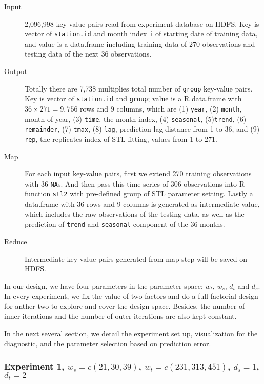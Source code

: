 \begin{description}
  \item[Input] 2,096,998 key-value pairs read from experiment database on HDFS.
  Key is vector of \texttt{station.id} and month index \texttt{i} of starting date
  of training data, and value is a data.frame including training data of 270 
  observations and testing data of the next 36 observations.
  \item[Output] Totally there are 7,738 multiplies total number of \texttt{group} 
  key-value pairs. 
  Key is vector of \texttt{station.id} and \texttt{group}; value is a R data.frame
  with $36 \times 271 = 9,756$ rows and 9 columns, which are (1) \texttt{year},
  (2) \texttt{month}, month of year, (3) \texttt{time}, the month index, (4) 
  \texttt{seasonal}, (5)\texttt{trend}, (6) \texttt{remainder}, (7) \texttt{tmax},
  (8) \texttt{lag}, prediction lag distance from 1 to 36, and (9) \texttt{rep},
  the replicates index of STL fitting, values from 1 to 271. 
  \item[Map] For each input key-value pairs, first we extend 270 training 
  observations with 36 \texttt{NA}s. And then pass this time series of 306 
  observations into R function \texttt{stl2} with pre-defined group of STL 
  parameter setting. Lastly a data.frame with 36 rows and 9 columns is generated
  as intermediate value, which includes the raw observations of the testing data, 
  as well as the prediction of \texttt{trend} and \texttt{seasonal} component of 
  the 36 months.
  \item[Reduce] Intermediate key-value pairs generated from map step will be saved
  on HDFS.
\end{description} 

In our design, we have four parameters in the parameter space: $w_t$, $w_s$, 
$d_t$ and $d_s$. In
every experiment, we fix the value of two factors and do a full factorial design
for anther two to explore and cover the design space. Besides, the number of inner
iterations and the number of outer iterations are also kept constant.

In the next several section, we detail the experiment set up, visualization for 
the diagnostic, and the parameter selection based on prediction error.

\subsubsection{Experiment 1,  
\textmd{$w_s=c(21, 30, 39)$, $w_t=c(231, 313, 451)$, $d_s=1$, $d_t=2$}
}

